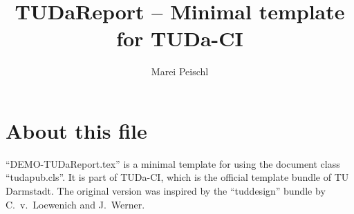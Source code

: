 \documentclass[
	english,%
	accentcolor=9c,%
	type=intern, %
	marginpar=false,%
]{tudapub}
\title{TUDaReport -- Minimal template for TUDa-CI}
\author{Marei Peischl}
\begin{document}
\maketitle


\tableofcontents


\section{About this file}

\enquote{DEMO-TUDaReport.tex} is a minimal template for using the document class \enquote{tudapub.cls}.
It is part of TUDa-CI, which is the official template bundle of TU Darmstadt. The original version was inspired by the \enquote{tuddesign} bundle by C.~v.~Loewenich and J.~Werner.
\end{document}
